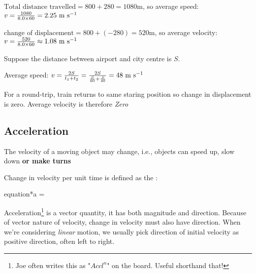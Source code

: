 
\begin{soln} $\text{Total distance travelled} = 800 + 280 = 1080 \text{m}$, so average speed: $v = \frac{1080}{8.0\times60} = 2.25 \text{ m s$^{-1}$}$

\eqyskip  $\text{change of displacement} = 800 + (-280) = 520 \text{m}$, so average velocity: $v = \frac{520}{8.0\times60} \approx 1.08 \text{ m s$^{-1}$}$ \end{soln}


\begin{soln} Suppose the distance between airport and city centre is $S$.

Average speed: $v = \frac{2S}{t_1 + t_2} = \frac{2S}{\frac{S}{60} + \frac{S}{40}} = 48 \text{ m s$^{-1}$}$

For a round-trip, train returns to same staring position so change in displacement is zero. Average velocity is therefore \emph{Zero} \end{soln} 


\subsection{Acceleration}

The velocity of a moving object may change, i.e., objects can speed up, slow down \textbf{or make turns}

\begin{ilight}
	\centering Change in velocity per unit time is defined as the : \begin{empheq}[box=\tcbhighmath]{equation*}{a = }\end{empheq}
\end{ilight}


Acceleration\footnote{Joe often writes this as "$Accl^{n}$" on the board. Useful shorthand that!} is a vector quantity, it has both magnitude and direction. Because of vector nature of velocity, change in velocity must also have direction. When we're considering \emph{linear} motion, we usually pick direction of initial velocity as positive direction, often left to right.

